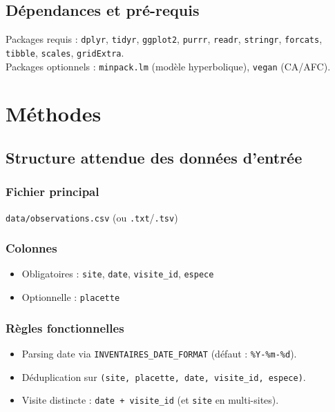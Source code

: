 \documentclass[11pt,a4paper]{article}
\begin{document}
\subsection{Dépendances et pré-requis}

Packages requis : \texttt{dplyr}, \texttt{tidyr}, \texttt{ggplot2}, \texttt{purrr}, \texttt{readr},
\texttt{stringr}, \texttt{forcats}, \texttt{tibble}, \texttt{scales}, \texttt{gridExtra}.\\
Packages optionnels : \texttt{minpack.lm} (modèle hyperbolique), \texttt{vegan} (CA/AFC).

\section{Méthodes}

\subsection{Structure attendue des données d'entrée}

\subsubsection{Fichier principal}
\texttt{data/observations.csv} (ou \texttt{.txt}/\texttt{.tsv})

\subsubsection{Colonnes}
\begin{itemize}
  \item Obligatoires : \texttt{site}, \texttt{date}, \texttt{visite\_id}, \texttt{espece}
  \item Optionnelle : \texttt{placette}
\end{itemize}

\subsubsection{Règles fonctionnelles}
\begin{itemize}
  \item Parsing date via \texttt{INVENTAIRES\_DATE\_FORMAT} (défaut : \texttt{\%Y-\%m-\%d}).
  \item Déduplication sur \texttt{(site, placette, date, visite\_id, espece)}.
  \item Visite distincte : \texttt{date + visite\_id} (et \texttt{site} en multi-sites).
\end{itemize}
\end{document}
